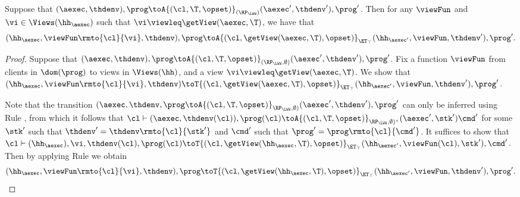\begin{proposition}
\label{prop:aexec2kv_transition}
Suppose that $(\aexec, \thdenv), \prog \toA{(\cl, \T, \opset)}_{(\RP_{\LWW})} (\aexec', \thdenv'), \prog'$. 
Then for any $\viewFun$ and $\vi \in \Views(\hh_{\aexec})$ such that $\vi \viewleq \getView(\aexec, \T)$, 
we have that 
\[
(\hh_{\aexec}, \viewFun\rmto{\cl}{\vi}, \thdenv), \prog \toA{(\cl, \getView(\aexec, \T), \opset)}_{\ET_{\top}} (\hh_{\aexec'}, \viewFun, \thdenv'), \prog'.
\]
\end{proposition}
\begin{proof}
Suppose that $(\aexec, \thdenv), \prog \toA{(\cl, \T, \opset)}_{(\RP_{\LWW}, \emptyset)} (\aexec', \thdenv'), \prog'$. 
Fix a function $\viewFun$ from clients in $\dom(\prog)$ to views in $\Views(\hh)$, and a view $\vi \viewleq \getView(\aexec, \T)$.
We show that 
$(\hh_{\aexec}, \viewFun\rmto{\cl}{\vi}, \thdenv) \toT{(\cl, \getView(\aexec, \T), \opset)}_{\ET_{\top}} (\hh_{\aexec'}, 
\viewFun, \thdenv'), \prog'$. 

Note that the transition $(\aexec, \thdenv, \prog \toA{(\cl, \T, \opset)}_{\RP_{\LWW}, \emptyset)} (\aexec', \thdenv'), \prog'$ 
can only be inferred using Rule , from which it follows that $\cl \vdash (\aexec, \thdenv(\cl)), \prog(\cl) 
\toA{(\cl, \T, \opset)}_{\RP_{\LWW}, \emptyset)}, (\aexec' ,\stk') \cmd'$ for some $\stk'$ such that $\thdenv' = 
\thdenv\rmto{\cl}{\stk'}$ and $\cmd'$ such that $\prog' = \prog\rmto{\cl}{\cmd'}$.
It suffices to show that $\cl \vdash (\hh_{\aexec}), \vi, \thdenv(\cl), \prog(\cl) \toT{(\cl, \getView(\hh_{\aexec}, \T), \opset)}_{\ET_{\top}} 
(\hh_{\aexec'}, \viewFun(\cl), \stk'), \cmd'$. Then by applying Rule  we obtain 
\[
(\hh_{\aexec}, \viewFun\rmto{\cl}{\vi}, \thdenv), \prog \toT{(\cl, \getView(\hh_{\aexec}, \T), \opset)}_{\ET_{\top}} 
(\hh_{\aexec'}, \viewFun, \thdenv'), \prog'.
\]


\end{proof}
